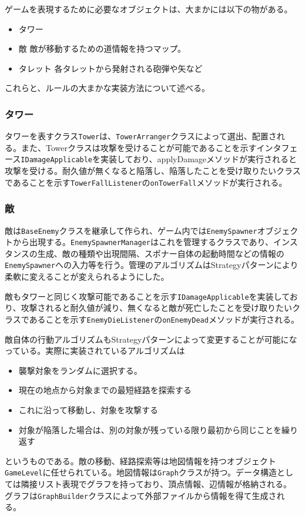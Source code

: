 \documentclass[11pt,a4j]{jarticle}
\begin{document}
ゲームを表現するために必要なオブジェクトは、大まかには以下の物がある。

\begin{itemize}
    \item タワー
    \item 敵
          \subitem 敵が移動するための道情報を持つマップ。
    \item タレット
          \subitem 各タレットから発射される砲弾や矢など
\end{itemize}

これらと、ルールの大まかな実装方法について述べる。

\subsubsection{タワー}

タワーを表すクラス\verb|Tower|は、\verb|TowerArranger|クラスによって選出、配置される。また、Towerクラスは攻撃を受けることが可能であることを示すインタフェース\verb|IDamageApplicable|を実装しており、applyDamageメソッドが実行されると攻撃を受ける。耐久値が無くなると陥落し、陥落したことを受け取りたいクラスであることを示す\verb|TowerFallListener|の\verb|onTowerFall|メソッドが実行される。

\subsubsection{敵}

敵は\verb|BaseEnemy|クラスを継承して作られ、ゲーム内では\verb|EnemySpawner|オブジェクトから出現する。\verb|EnemySpawnerManager|はこれを管理するクラスであり、インスタンスの生成、敵の種類や出現間隔、スポナー自体の起動時間などの情報の\verb|EnemySpawner|への入力等を行う。管理のアルゴリズムはStrategyパターンにより柔軟に変えることが変えられるようにした。

敵もタワーと同じく攻撃可能であることを示す\verb|IDamageApplicable|を実装しており、攻撃されると耐久値が減り、無くなると敵が死亡したことを受け取りたいクラスであることを示す\verb|EnemyDieListener|の\verb|onEnemyDead|メソッドが実行される。

敵自体の行動アルゴリズムもStrategyパターンによって変更することが可能になっている。実際に実装されているアルゴリズムは
\begin{itemize}
    \item 襲撃対象をランダムに選択する。
    \item 現在の地点から対象までの最短経路を探索する
    \item これに沿って移動し、対象を攻撃する
    \item 対象が陥落した場合は、別の対象が残っている限り最初から同じことを繰り返す
\end{itemize}
というものである。敵の移動、経路探索等は地図情報を持つオブジェクト\verb|GameLevel|に任せられている。地図情報は\verb|Graph|クラスが持つ。データ構造としては隣接リスト表現でグラフを持っており、頂点情報、辺情報が格納される。
グラフは\verb|GraphBuilder|クラスによって外部ファイルから情報を得て生成される。
\end{document}
